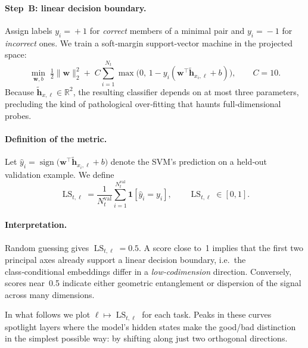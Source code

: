 \documentclass{article}
\begin{document}
\paragraph{Step B: linear decision boundary.}
Assign labels
$y_i\!=\!+1$ for \emph{correct} members of a minimal pair and
$y_i\!=\!-1$ for \emph{incorrect} ones.
We train a soft‑margin support‑vector machine in the projected space:
\begin{equation}
\label{eq:svm}
\min_{\mathbf w,b}\;
\tfrac12\|\mathbf w\|_2^2
+\;C\sum_{i=1}^{N_t}
\max\!\bigl(0,\,1-y_i(\mathbf w^\top\tilde{\mathbf h}_{x_i,\ell}+b)\bigr),
\qquad
C=10.
\end{equation}
Because $\tilde{\mathbf h}_{x,\ell}\!\in\!\mathbb R^2$, the resulting
classifier depends on at most three parameters, precluding the kind of
pathological over‑fitting that haunts full‑dimensional probes.

\paragraph{Definition of the metric.}
Let
$
  \hat y_i
  =\operatorname{sign}\!\bigl(\mathbf w^\top\tilde{\mathbf h}_{x_i,\ell}+b\bigr)
$
denote the SVM’s prediction on a held‑out validation example.
We define
\begin{equation}
\label{eq:ls-score}
\operatorname{LS}_{t,\ell}
=\frac{1}{N_t^{\text{val}}}
 \sum_{i=1}^{N_t^{\text{val}}}\mathbf 1[\hat y_i=y_i],
\qquad
\operatorname{LS}_{t,\ell}\in[0,1].
\end{equation}

\paragraph{Interpretation.}
Random guessing gives $\operatorname{LS}_{t,\ell}=0.5$.
A score close to 1 implies that the first two principal axes already
support a linear decision boundary, i.e.\ the class‑conditional embeddings
differ in a \emph{low‑codimension} direction.
Conversely, scores near 0.5 indicate either geometric entanglement or
dispersion of the signal across many dimensions.

\vspace{0.3\baselineskip}
In what follows we plot $\ell\mapsto\operatorname{LS}_{t,\ell}$ for each
task. Peaks in these curves spotlight layers where the model’s hidden
states make the good/bad distinction in the simplest possible way: by
shifting along just two orthogonal directions.

\end{document}

